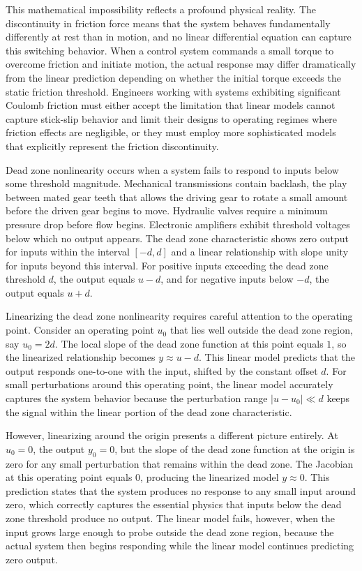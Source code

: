 This mathematical impossibility reflects a profound physical reality. The discontinuity in friction force means that the system behaves fundamentally differently at rest than in motion, and no linear differential equation can capture this switching behavior. When a control system commands a small torque to overcome friction and initiate motion, the actual response may differ dramatically from the linear prediction depending on whether the initial torque exceeds the static friction threshold. Engineers working with systems exhibiting significant Coulomb friction must either accept the limitation that linear models cannot capture stick-slip behavior and limit their designs to operating regimes where friction effects are negligible, or they must employ more sophisticated models that explicitly represent the friction discontinuity.

Dead zone nonlinearity occurs when a system fails to respond to inputs below some threshold magnitude. Mechanical transmissions contain backlash, the play between mated gear teeth that allows the driving gear to rotate a small amount before the driven gear begins to move. Hydraulic valves require a minimum pressure drop before flow begins. Electronic amplifiers exhibit threshold voltages below which no output appears. The dead zone characteristic shows zero output for inputs within the interval $[-d, d]$ and a linear relationship with slope unity for inputs beyond this interval. For positive inputs exceeding the dead zone threshold $d$, the output equals $u - d$, and for negative inputs below $-d$, the output equals $u + d$.

Linearizing the dead zone nonlinearity requires careful attention to the operating point. Consider an operating point $u_0$ that lies well outside the dead zone region, say $u_0 = 2d$. The local slope of the dead zone function at this point equals $1$, so the linearized relationship becomes $y \approx u - d$. This linear model predicts that the output responds one-to-one with the input, shifted by the constant offset $d$. For small perturbations around this operating point, the linear model accurately captures the system behavior because the perturbation range $|u - u_0| \ll d$ keeps the signal within the linear portion of the dead zone characteristic.

However, linearizing around the origin presents a different picture entirely. At $u_0 = 0$, the output $y_0 = 0$, but the slope of the dead zone function at the origin is zero for any small perturbation that remains within the dead zone. The Jacobian at this operating point equals $0$, producing the linearized model $y \approx 0$. This prediction states that the system produces no response to any small input around zero, which correctly captures the essential physics that inputs below the dead zone threshold produce no output. The linear model fails, however, when the input grows large enough to probe outside the dead zone region, because the actual system then begins responding while the linear model continues predicting zero output.

